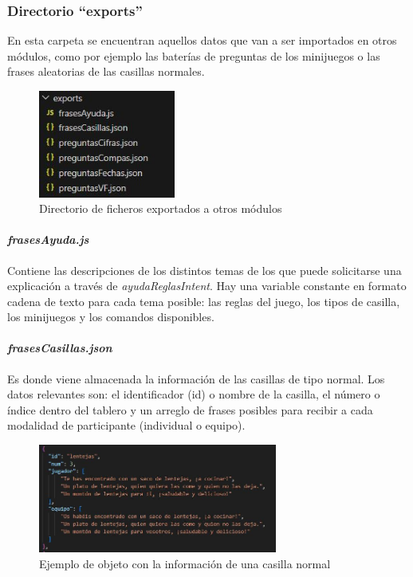 \subsubsection{Directorio \enquote{exports}}

En esta carpeta se encuentran aquellos datos que van a ser importados en otros módulos, como por ejemplo las baterías de preguntas de los minijuegos o las frases aleatorias de las casillas normales.

\begin{figure}[H]
	\centering
	\includegraphics[width=0.4\textwidth]{imgs/exp-carpeta.jpg}
	\caption{Directorio de ficheros exportados a otros módulos}
	\label{fig:exp-carpeta}
\end{figure}

\paragraph{\textit{frasesAyuda.js}}

Contiene las descripciones de los distintos temas de los que puede solicitarse una explicación a través de \textit{ayudaReglasIntent}. Hay una variable constante en formato cadena de texto para cada tema posible: las reglas del juego, los tipos de casilla, los minijuegos y los comandos disponibles.

\paragraph{\textit{frasesCasillas.json}}

Es donde viene almacenada la información de las casillas de tipo normal. Los datos relevantes son: el identificador (id) o nombre de la casilla, el número o índice dentro del tablero y un arreglo de frases posibles para recibir a cada modalidad de participante (individual o equipo).

\begin{figure}[H]
	\centering
	\includegraphics[width=0.7\textwidth]{imgs/exp-casillas.jpg}
	\caption{Ejemplo de objeto con la información de una casilla normal}
	\label{fig:exp-casillas}
\end{figure}

